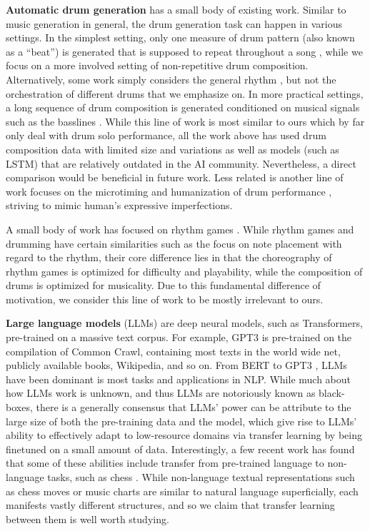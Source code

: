 \documentclass[letterpaper]{article} %
\begin{document}
\textbf{Automatic drum generation} has a small body of existing work. Similar to music generation in general, the drum generation task can happen in various settings. In the simplest setting, only one measure of drum pattern (also known as a ``beat'') is generated that is supposed to repeat throughout a song  \cite{vogl2017intelligent,bruford2020jaki,complexis21}, while we focus on a more involved setting of non-repetitive drum composition. Alternatively, some work simply considers the general rhythm \cite{lattner2019high}, but not the orchestration of different drums that we emphasize on. In more practical settings, a long sequence of drum composition is generated conditioned on musical signals such as the basslines \cite{makris2017combining,makris2019conditional}. While this line of work is most similar to ours which by far only deal with drum solo performance, all the work above has used drum composition data with limited size and variations as well as models (such as LSTM) that are relatively outdated in the AI community. Nevertheless, a direct comparison would be beneficial in future work. Less related is another line of work focuses on the microtiming and humanization of drum performance \cite{gillick2019learning,burloiu2020adaptive,burloiu2020interactive}, striving to mimic human's expressive imperfections.

A small body of work has focused on rhythm games \cite{donahue2017dance,liang2019procedural}. While rhythm games and drumming have certain similarities such as the focus on note placement with regard to the rhythm, their core difference lies in that the choreography of rhythm games is optimized for difficulty and playability, while the composition of drums is optimized for musicality. Due to this fundamental difference of motivation, we consider this line of work to be mostly irrelevant to ours.

\textbf{Large language models} (LLMs) are deep neural models, such as Transformers, pre-trained on a massive text corpus. For example, GPT3 is pre-trained on the compilation of Common Crawl, containing most texts in the world wide net, publicly available books, Wikipedia, and so on. From BERT \cite{devlin-etal-2019-bert} to GPT3 \cite{NEURIPS2020_1457c0d6}, LLMs have been dominant is most tasks and applications in NLP. While much about how LLMs work is unknown, and thus LLMs are notoriously known as black-boxes, there is a generally consensus that LLMs' power can be attribute to the large size of both the pre-training data and the model, which give rise to LLMs' ability to effectively adapt to low-resource domains via transfer learning by being finetuned on a small amount of data. Interestingly, a few recent work has found that some of these abilities include transfer from pre-trained language to non-language tasks, such as chess \cite{stockl-2021-watching}. While non-language textual representations such as chess moves or music charts are similar to natural language superficially, each manifests vastly different structures, and so we claim that transfer learning between them is well worth studying.
\end{document}
